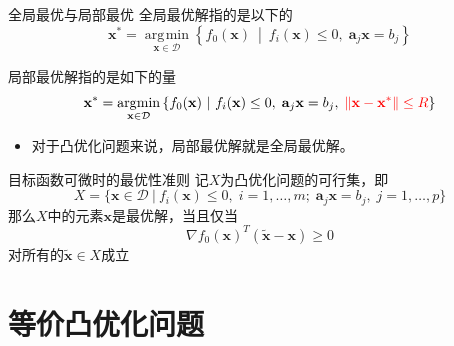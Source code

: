\documentclass[10pt]{beamer}
\DeclareMathOperator*{\argmin}{\arg\!\min}
\begin{document}

\begin{frame}

\begin{block}{全局最优与局部最优}
全局最优解指的是以下的
$$\mathbf{x}^* = \argmin\limits_{\mathbf{x} \in \mathcal{D}} \left\{ f_0(\mathbf{x}) \ \middle|\ f_i(\mathbf{x}) \le 0, \; \mathbf{a}_j\mathbf{x} = b_j \right\}$$

局部最优解指的是如下的量
$$\mathbf{x}^* = \argmin\limits_{\mathbf{x} \in \mathcal{D}} \left\{ f_0(\mathbf{x}) \ \middle|\ f_i(\mathbf{x}) \le 0, \; \mathbf{a}_j\mathbf{x} = b_j, \; {\color{red} \Vert \mathbf{x} - \mathbf{x}^* \Vert \le R}\right\}$$

\vspace{1em}
\pause

\begin{itemize}
\item 对于凸优化问题来说，局部最优解就是全局最优解。
\end{itemize}
\end{block}

\end{frame}


\begin{frame}

\begin{block}{目标函数可微时的最优性准则}
记$X$为凸优化问题的可行集，即
$$X = \{ \mathbf{x} \in \mathcal{D} \ |\ f_i(\mathbf{x}) \le 0, \; i = 1,\ldots,m;\; \mathbf{a}_j\mathbf{x} = b_j, \; j=1,\ldots,p \}$$
那么$X$中的元素$\mathbf{x}$是最优解，当且仅当
$$\nabla f_0(\mathbf{x})^T(\widetilde{\mathbf{x}} - \mathbf{x}) \ge 0$$
对所有的$\widetilde{\mathbf{x}} \in X$成立
\end{block}

\end{frame}


\section{等价凸优化问题}

\end{document}
